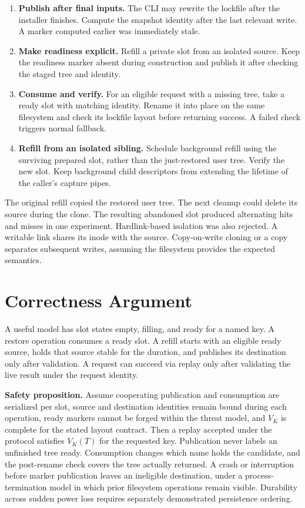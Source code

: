 \documentclass[
  11pt,
  letterpaper,
]{article}
\providecommand{\tightlist}{%
  \setlength{\itemsep}{0pt}\setlength{\parskip}{0pt}}
\begin{document}
\begin{enumerate}
\def\labelenumi{\arabic{enumi}.}
\tightlist
\item
  \textbf{Publish after final inputs.} The CLI may rewrite the lockfile
  after the installer finishes. Compute the snapshot identity after the
  last relevant write. A marker computed earlier was immediately stale.
\item
  \textbf{Make readiness explicit.} Refill a private slot from an
  isolated source. Keep the readiness marker absent during construction
  and publish it after checking the staged tree and identity.
\item
  \textbf{Consume and verify.} For an eligible request with a missing
  tree, take a ready slot with matching identity. Rename it into place
  on the same filesystem and check its lockfile layout before returning
  success. A failed check triggers normal fallback.
\item
  \textbf{Refill from an isolated sibling.} Schedule background refill
  using the surviving prepared slot, rather than the just-restored user
  tree. Verify the new slot. Keep background child descriptors from
  extending the lifetime of the caller's capture pipes.
\end{enumerate}

The original refill copied the restored user tree. The next cleanup
could delete its source during the clone. The resulting abandoned slot
produced alternating hits and misses in one experiment. Hardlink-based
isolation was also rejected. A writable link shares its inode with the
source. Copy-on-write cloning or a copy separates subsequent writes,
assuming the filesystem provides the expected semantics.

\section{Correctness Argument}\label{correctness-argument}

A useful model has slot states empty, filling, and ready for a named
key. A restore operation consumes a ready slot. A refill starts with an
eligible ready source, holds that source stable for the duration, and
publishes its destination only after validation. A request can succeed
via replay only after validating the live result under the request
identity.

\textbf{Safety proposition.} Assume cooperating publication and
consumption are serialized per slot, source and destination identities
remain bound during each operation, ready markers cannot be forged
within the threat model, and \(V_K\) is complete for the stated layout
contract. Then a replay accepted under the protocol satisfies \(V_K(T)\)
for the requested key. Publication never labels an unfinished tree
ready. Consumption changes which name holds the candidate, and the
post-rename check covers the tree actually returned. A crash or
interruption before marker publication leaves an ineligible destination,
under a process-termination model in which prior filesystem operations
remain visible. Durability across sudden power loss requires separately
demonstrated persistence ordering.
\end{document}
